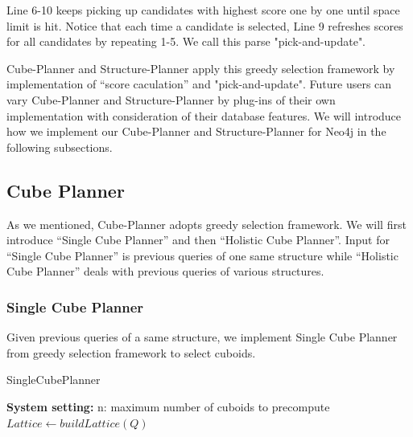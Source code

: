 Line 6-10 keeps picking up candidates with highest score one by one until space limit is hit. Notice that each time a candidate is selected, Line 9 refreshes scores for all candidates by repeating 1-5. We call this parse "pick-and-update".   

Cube-Planner and Structure-Planner apply this greedy selection framework by implementation of ``score caculation'' and "pick-and-update". Future users can vary Cube-Planner and Structure-Planner by plug-ins of their own implementation with consideration of their database features. We will introduce how we implement our Cube-Planner and Structure-Planner for Neo4j in the following subsections.
 
\subsection{Cube Planner}
As we mentioned, Cube-Planner adopts greedy selection framework. We will first introduce ``Single Cube Planner'' and then ``Holistic Cube Planner''. Input for ``Single Cube Planner'' is previous queries of one same structure while ``Holistic Cube Planner'' deals with previous queries of various structures.
\subsubsection{Single Cube Planner}
\label{Single Cube Planner}

Given previous queries of a same structure, we implement  Single Cube Planner from greedy selection framework to select cuboids. 

\begin{algorithm}[H]
	\caption{SingleCubePlanner}
	\LinesNumbered 
	\textbf{System setting:} n: maximum number of cuboids to precompute\\ 
	$Lattice \leftarrow buildLattice(Q)$\;
	
\end{algorithm}
\clearpage

